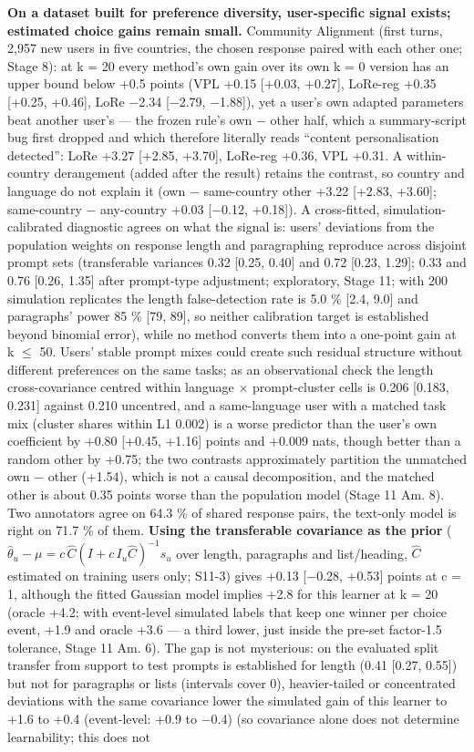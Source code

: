 \documentclass{article}
\begin{document}
\textbf{On a dataset built for preference diversity, user-specific signal exists; estimated choice gains remain small.} Community Alignment (first turns, 2,957 new users in five countries, the chosen response paired with each other one; Stage 8): at k = 20 every method's own gain over its own k = 0 version has an upper bound below +0.5 points (VPL +0.15 {[}+0.03, +0.27{]}, LoRe-reg +0.35 {[}+0.25, +0.46{]}, LoRe $-$2.34 {[}$-$2.79, $-$1.88{]}), yet a user's own adapted parameters beat another user's --- the frozen rule's own $-$ other half, which a summary-script bug first dropped and which therefore literally reads ``content personalisation detected'': LoRe +3.27 {[}+2.85, +3.70{]}, LoRe-reg +0.36, VPL +0.31. A within-country derangement (added after the result) retains the contrast, so country and language do not explain it (own $-$ same-country other +3.22 {[}+2.83, +3.60{]}; same-country $-$ any-country +0.03 {[}$-$0.12, +0.18{]}). A cross-fitted, simulation-calibrated diagnostic agrees on what the signal is: users' deviations from the population weights on response length and paragraphing reproduce across disjoint prompt sets (transferable variances 0.32 {[}0.25, 0.40{]} and 0.72 {[}0.23, 1.29{]}; 0.33 and 0.76 {[}0.26, 1.35{]} after prompt-type adjustment; exploratory, Stage 11; with 200 simulation replicates the length false-detection rate is 5.0 \% {[}2.4, 9.0{]} and paragraphs' power 85 \% {[}79, 89{]}, so neither calibration target is established beyond binomial error), while no method converts them into a one-point gain at k $\leq$ 50. Users' stable prompt mixes could create such residual structure without different preferences on the same tasks; as an observational check the length cross-covariance centred within language $\times$ prompt-cluster cells is 0.206 {[}0.183, 0.231{]} against 0.210 uncentred, and a same-language user with a matched task mix (cluster shares within L1 0.002) is a worse predictor than the user's own coefficient by +0.80 {[}+0.45, +1.16{]} points and +0.009 nats, though better than a random other by +0.75; the two contrasts approximately partition the unmatched own $-$ other (+1.54), which is not a causal decomposition, and the matched other is about 0.35 points worse than the population model (Stage 11 Am. 8). Two annotators agree on 64.3 \% of shared response pairs, the text-only model is right on 71.7 \% of them. \textbf{Using the transferable covariance as the prior} (\(\hat\theta_u - \mu = c\,\hat C (I + c\, I_u \hat C)^{-1} s_u\) over length, paragraphs and list/heading, $\hat C$ estimated on training users only; S11-3) gives +0.13 {[}$-$0.28, +0.53{]} points at c = 1, although the fitted Gaussian model implies +2.8 for this learner at k = 20 (oracle +4.2; with event-level simulated labels that keep one winner per choice event, +1.9 and oracle +3.6 --- a third lower, just inside the pre-set factor-1.5 tolerance, Stage 11 Am. 6). The gap is not mysterious: on the evaluated split transfer from support to test prompts is established for length (0.41 {[}0.27, 0.55{]}) but not for paragraphs or lists (intervals cover 0), heavier-tailed or concentrated deviations with the same covariance lower the simulated gain of this learner to +1.6 to +0.4 (event-level: +0.9 to $-$0.4) (so covariance alone does not determine learnability; this does not 
\end{document}

